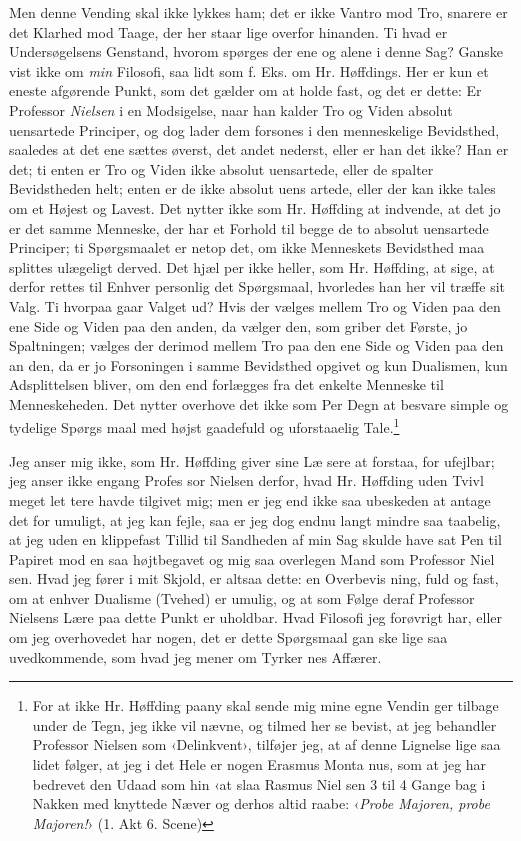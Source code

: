 \documentclass[12pt,a4paper,openany]{book}
\renewcommand{\thefootnote}{*)}
\newcommand{\fnmark}[2]{\renewcommand{\thefootnote}{#1}\footnote{#2}%
  \renewcommand{\thefootnote}{*)}}
\newcommand{\opage}[1]{\marginnote{\footnotesize\textit{[#1]}}}
\begin{document}
Men denne Vending skal ikke lykkes ham; det er ikke Vantro
mod Tro, snarere er det Klarhed mod Taage, der her staar lige
overfor hinanden. Ti hvad er Undersøgelsens Genstand, hvorom
spørges der ene og alene i denne Sag? Ganske vist ikke om \emph{min}
Filosofi, saa lidt som f. Eks. om Hr. Høffdings. Her er kun et
eneste afgørende Punkt, som det gælder om at holde fast, og
det er dette: Er Professor \emph{Nielsen} i en Modsigelse, naar han
kalder Tro og Viden absolut uensartede Principer, og dog lader
dem forsones i den menneskelige Bevidsthed, saaledes at det
ene sættes øverst, det andet nederst, eller er han det ikke? Han
er det; ti enten er Tro og Viden ikke absolut uensartede, eller
de spalter Bevidstheden helt; enten er de ikke absolut uens\-%
artede, eller der kan ikke tales om et Højest og Lavest. Det
\opage{18}nytter ikke som Hr. Høffding at indvende, at det jo er det
samme Menneske, der har et Forhold til begge de to absolut
uensartede Principer; ti Spørgsmaalet er netop det, om ikke
Menneskets Bevidsthed maa splittes ulægeligt derved. Det hjæl\-%
per ikke heller, som Hr. Høffding, at sige, at derfor rettes til
Enhver personlig det Spørgsmaal, hvorledes han her vil træffe
sit Valg. Ti hvorpaa gaar Valget ud? Hvis der vælges mellem
Tro og Viden paa den ene Side og Viden paa den anden, da
vælger den, som griber det Første, jo Spaltningen; vælges der
derimod mellem Tro paa den ene Side og Viden paa den an\-%
den, da er jo Forsoningen i samme Bevidsthed opgivet og kun
Dualismen, kun Adsplittelsen bliver, om den end forlægges fra
det enkelte Menneske til Menneskeheden. Det nytter overhove\-%
det ikke som Per Degn at besvare simple og tydelige Spørgs\-%
maal med højst gaadefuld og uforstaaelig Tale.\fnmark{*)}{For at ikke Hr. Høffding paany skal sende mig mine egne Vendin\-%
ger tilbage under de Tegn, jeg ikke vil nævne, og tilmed her se bevist, at
jeg behandler Professor Nielsen som ‹Delinkvent›, tilføjer jeg, at af denne
Lignelse lige saa lidet følger, at jeg i det Hele er nogen Erasmus Monta\-%
nus, som at jeg har bedrevet den Udaad som hin ‹at slaa Rasmus Niel\-%
sen 3 til 4 Gange bag i Nakken med knyttede Næver og derhos altid raabe:
‹\emph{Probe Majoren, probe Majoren!}› (1. Akt 6. Scene)}

Jeg anser mig ikke, som Hr. Høffding giver sine Læ\-%
sere at forstaa, for ufejlbar; jeg anser ikke engang Profes\-%
sor Nielsen derfor, hvad Hr. Høffding uden Tvivl meget let\-%
tere havde tilgivet mig; men er jeg end ikke saa ubeskeden at
antage det for umuligt, at jeg kan fejle, saa er jeg dog endnu
langt mindre saa taabelig, at jeg uden en klippefast Tillid til
Sandheden af min Sag skulde have sat Pen til Papiret mod en
saa højtbegavet og mig saa overlegen Mand som Professor Niel\-%
sen. Hvad jeg fører i mit Skjold, er altsaa dette: en Overbevis\-%
ning, fuld og fast, om at enhver Dualisme (Tvehed) er umulig,
og at som Følge deraf Professor Nielsens Lære paa dette
Punkt er uholdbar. Hvad Filosofi jeg forøvrigt har, eller om
jeg overhovedet har nogen, det er dette Spørgsmaal gan\-%
ske lige saa uvedkommende, som hvad jeg mener om Tyrker\-%
nes Affærer.
\end{document}
